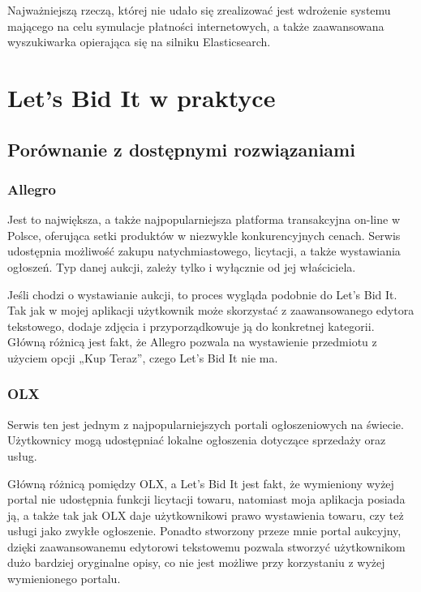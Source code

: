 \documentclass[brudnopis]{xmgr}
\begin{document}
Najważniejszą rzeczą, której nie udało się zrealizować jest wdrożenie systemu mającego na celu symulacje płatności internetowych, a także zaawansowana wyszukiwarka opierająca się na silniku Elasticsearch.


\chapter{Let's Bid It w praktyce}

\section{Porównanie z dostępnymi rozwiązaniami}

\subsection{Allegro} 

Jest to największa, a także najpopularniejsza platforma transakcyjna on-line w Polsce, oferująca setki produktów w niezwykle konkurencyjnych cenach. Serwis udostępnia możliwość zakupu natychmiastowego, licytacji, a także wystawiania ogłoszeń. Typ danej aukcji, zależy tylko i wyłącznie od jej właściciela.

Jeśli chodzi o wystawianie aukcji, to proces wygląda podobnie do Let's Bid It. Tak jak w mojej aplikacji użytkownik może skorzystać z zaawansowanego edytora tekstowego, dodaje zdjęcia i przyporządkowuje ją do konkretnej kategorii. Główną różnicą jest fakt, że Allegro pozwala na wystawienie przedmiotu z użyciem opcji „Kup Teraz”, czego Let's Bid It nie ma.

\subsection{OLX}  

Serwis ten jest jednym z najpopularniejszych portali ogłoszeniowych na świecie. Użytkownicy
mogą udostępniać lokalne ogłoszenia dotyczące sprzedaży oraz usług.

Główną różnicą pomiędzy OLX, a Let's Bid It jest fakt,
że wymieniony wyżej portal nie udostępnia funkcji licytacji towaru, natomiast moja aplikacja posiada ją, a także tak jak OLX daje użytkownikowi prawo wystawienia towaru, czy też usługi jako zwykłe ogłoszenie. Ponadto stworzony przeze mnie portal aukcyjny, dzięki zaawansowanemu edytorowi tekstowemu pozwala stworzyć użytkownikom dużo bardziej oryginalne opisy, co nie jest możliwe przy korzystaniu z wyżej wymienionego portalu.
\end{document}
